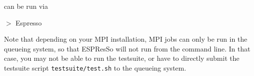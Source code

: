 \es{} can be run via
\begin{syntax}
$>$ Espresso   
\end{syntax}

Note that depending on your MPI installation, MPI jobs can only be run
in the queueing system, so that ESPResSo will not run from the command
line. In that case, you may not be able to run the testsuite, or have
to directly submit the testsuite script \verb!testsuite/test.sh! to
the queueing system.


